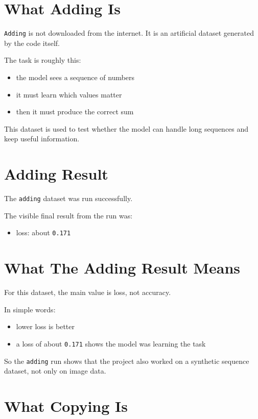 \documentclass[12pt]{article}
\begin{document}
\section*{What Adding Is}

\texttt{Adding} is not downloaded from the internet. It is an artificial dataset generated by the code itself.

The task is roughly this:

\begin{itemize}
    \item the model sees a sequence of numbers
    \item it must learn which values matter
    \item then it must produce the correct sum
\end{itemize}

This dataset is used to test whether the model can handle long sequences and keep useful information.

\section*{Adding Result}

The \texttt{adding} dataset was run successfully.

The visible final result from the run was:

\begin{itemize}
    \item loss: about \texttt{0.171}
\end{itemize}

\section*{What The Adding Result Means}

For this dataset, the main value is loss, not accuracy.

In simple words:

\begin{itemize}
    \item lower loss is better
    \item a loss of about \texttt{0.171} shows the model was learning the task
\end{itemize}

So the \texttt{adding} run shows that the project also worked on a synthetic sequence dataset, not only on image data.

\section*{What Copying Is}
\end{document}
